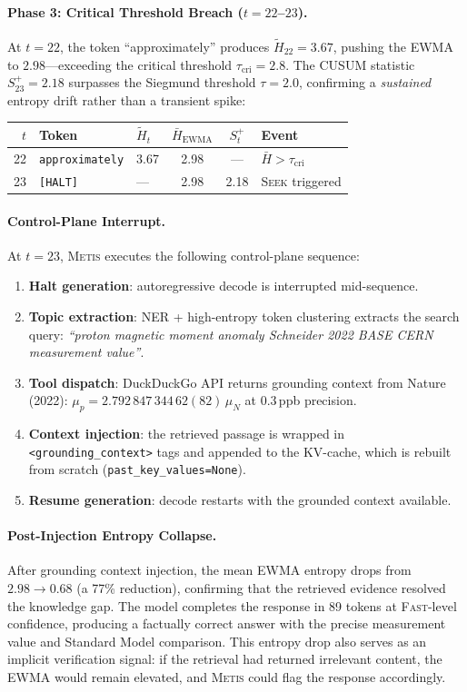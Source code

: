 \documentclass[11pt,a4paper]{article}
\newcommand{\metis}{\textsc{Metis}}
\begin{document}
\paragraph{Phase 3: Critical Threshold Breach ($t{=}22$--$23$).}
At $t{=}22$, the token ``approximately'' produces $\tilde{H}_{22}{=}3.67$, pushing the EWMA to $2.98$---exceeding the critical threshold $\tau_{\text{cri}}{=}2.8$. The CUSUM statistic $S_{23}^+{=}2.18$ surpasses the Siegmund threshold $\tau{=}2.0$, confirming a \emph{sustained} entropy drift rather than a transient spike:

\begin{center}
\small
\begin{tabular}{@{}rllccl@{}}
\toprule
$t$ & \textbf{Token} & $\tilde{H}_t$ & $\bar{H}_{\text{EWMA}}$ & $S_t^+$ & \textbf{Event} \\
\midrule
22 & \texttt{approximately} & 3.67 & 2.98 & --- & $\bar{H} > \tau_{\text{cri}}$ \\
23 & \texttt{[HALT]}        & ---  & 2.98 & 2.18 & \textsc{Seek} triggered \\
\bottomrule
\end{tabular}
\end{center}

\paragraph{Control-Plane Interrupt.}
At $t{=}23$, \metis{} executes the following control-plane sequence:
\begin{enumerate}[nosep,leftmargin=*]
    \item \textbf{Halt generation}: autoregressive decode is interrupted mid-sequence.
    \item \textbf{Topic extraction}: NER + high-entropy token clustering extracts the search query: \emph{``proton magnetic moment anomaly Schneider 2022 BASE CERN measurement value''}.
    \item \textbf{Tool dispatch}: DuckDuckGo API returns grounding context from Nature (2022): $\mu_p = 2.792\,847\,344\,62(82)\,\mu_N$ at 0.3\,ppb precision.
    \item \textbf{Context injection}: the retrieved passage is wrapped in \texttt{<grounding\_context>} tags and appended to the KV-cache, which is rebuilt from scratch (\texttt{past\_key\_values=None}).
    \item \textbf{Resume generation}: decode restarts with the grounded context available.
\end{enumerate}

\paragraph{Post-Injection Entropy Collapse.}
After grounding context injection, the mean EWMA entropy drops from $2.98 \to 0.68$ (a 77\% reduction), confirming that the retrieved evidence resolved the knowledge gap. The model completes the response in 89 tokens at \textsc{Fast}-level confidence, producing a factually correct answer with the precise measurement value and Standard Model comparison. This entropy drop also serves as an implicit verification signal: if the retrieval had returned irrelevant content, the EWMA would remain elevated, and \metis{} could flag the response accordingly.
\end{document}
